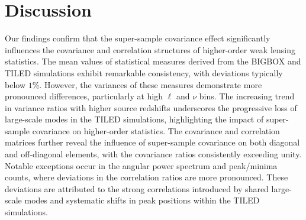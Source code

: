 \section{Discussion}
Our findings confirm that the super-sample covariance effect significantly influences the covariance and correlation structures of higher-order weak lensing statistics. The mean values of statistical measures derived from the BIGBOX and TILED simulations exhibit remarkable consistency, with deviations typically below $1\%$. However, the variances of these measures demonstrate more pronounced differences, particularly at high $\ell$ and $\nu$ bins. The increasing trend in variance ratios with higher source redshifts underscores the progressive loss of large-scale modes in the TILED simulations, highlighting the impact of super-sample covariance on higher-order statistics. The covariance and correlation matrices further reveal the influence of super-sample covariance on both diagonal and off-diagonal elements, with the covariance ratios consistently exceeding unity. Notable exceptions occur in the angular power spectrum and peak/minima counts, where deviations in the correlation ratios are more pronounced. These deviations are attributed to the strong correlations introduced by shared large-scale modes and systematic shifts in peak positions within the TILED simulations.